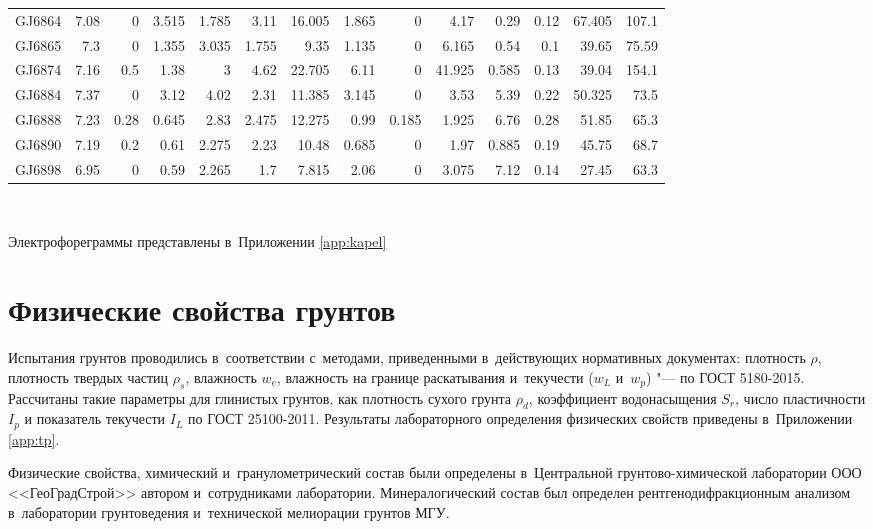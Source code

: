 \begin{table}[]
\begin{tabular}{@{}lrrrrrrrrrrrrr@{}}
    GJ6864 & 7.08 & 0 & 3.515 & 1.785 & 3.11 & 16.005 & 1.865 & 0 & 4.17 & 0.29 & 0.12 & 67.405 & 107.1 \\
    GJ6865 & 7.3 & 0 & 1.355 & 3.035 & 1.755 & 9.35 & 1.135 & 0 & 6.165 & 0.54 & 0.1 & 39.65 & 75.59 \\
    GJ6874 & 7.16 & 0.5 & 1.38 & 3 & 4.62 & 22.705 & 6.11 & 0 & 41.925 & 0.585 & 0.13 & 39.04 & 154.1 \\
    GJ6884 & 7.37 & 0 & 3.12 & 4.02 & 2.31 & 11.385 & 3.145 & 0 & 3.53 & 5.39 & 0.22 & 50.325 & 73.5 \\
    GJ6888 & 7.23 & 0.28 & 0.645 & 2.83 & 2.475 & 12.275 & 0.99 & 0.185 & 1.925 & 6.76 & 0.28 & 51.85 & 65.3 \\
    GJ6890 & 7.19 & 0.2 & 0.61 & 2.275 & 2.23 & 10.48 & 0.685 & 0 & 1.97 & 0.885 & 0.19 & 45.75 & 68.7 \\
    GJ6898 & 6.95 & 0 & 0.59 & 2.265 & 1.7 & 7.815 & 2.06 & 0 & 3.075 & 7.12 & 0.14 & 27.45 & 63.3 \\
    \bottomrule 
    \end{tabular}
    \\ 
\end{table}

Электрофореграммы представлены в~Приложении \ref{app:kapel}


\section{Физические свойства грунтов}

Испытания грунтов проводились в~соответствии с~методами, приведенными в~действующих нормативных документах:
плотность $\rho$, 
плотность твердых частиц $\rho_s$, 
влажность $w_e$, 
влажность на границе раскатывания и~текучести ($w_L$ и~$w_p$) "--- по ГОСТ 5180-2015. 
Рассчитаны такие параметры для глинистых грунтов, как
плотность сухого грунта $\rho_d$,  
коэффициент водонасыщения $S_r$, 
число пластичности $I_p$ 
и показатель текучести $I_L$ по ГОСТ 25100-2011.
Результаты лабораторного определения физических свойств приведены в~Приложении \ref{app:tp}.



Физические свойства, химический и~гранулометрический состав были определены в~Центральной грунтово-химической лаборатории ООО <<ГеоГрадСтрой>> автором и~сотрудниками лаборатории. Минералогический состав был определен рентгенодифракционным анализом в~лаборатории грунтоведения и~технической мелиорации грунтов МГУ.


